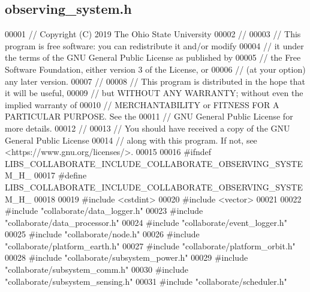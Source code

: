 \hypertarget{observing__system_8h_source}{}\subsection{observing\+\_\+system.\+h}
\label{observing__system_8h_source}

\begin{DoxyCode}
00001 \textcolor{comment}{// Copyright (C) 2019 The Ohio State University}
00002 \textcolor{comment}{//}
00003 \textcolor{comment}{// This program is free software: you can redistribute it and/or modify}
00004 \textcolor{comment}{// it under the terms of the GNU General Public License as published by}
00005 \textcolor{comment}{// the Free Software Foundation, either version 3 of the License, or}
00006 \textcolor{comment}{// (at your option) any later version.}
00007 \textcolor{comment}{//}
00008 \textcolor{comment}{// This program is distributed in the hope that it will be useful,}
00009 \textcolor{comment}{// but WITHOUT ANY WARRANTY; without even the implied warranty of}
00010 \textcolor{comment}{// MERCHANTABILITY or FITNESS FOR A PARTICULAR PURPOSE.  See the}
00011 \textcolor{comment}{// GNU General Public License for more details.}
00012 \textcolor{comment}{//}
00013 \textcolor{comment}{// You should have received a copy of the GNU General Public License}
00014 \textcolor{comment}{// along with this program.  If not, see <https://www.gnu.org/licenses/>.}
00015 
00016 \textcolor{preprocessor}{#ifndef LIBS\_COLLABORATE\_INCLUDE\_COLLABORATE\_OBSERVING\_SYSTEM\_H\_}
00017 \textcolor{preprocessor}{#define LIBS\_COLLABORATE\_INCLUDE\_COLLABORATE\_OBSERVING\_SYSTEM\_H\_}
00018 
00019 \textcolor{preprocessor}{#include <cstdint>}
00020 \textcolor{preprocessor}{#include <vector>}
00021 
00022 \textcolor{preprocessor}{#include "collaborate/data\_logger.h"}
00023 \textcolor{preprocessor}{#include "collaborate/data\_processor.h"}
00024 \textcolor{preprocessor}{#include "collaborate/event\_logger.h"}
00025 \textcolor{preprocessor}{#include "collaborate/node.h"}
00026 \textcolor{preprocessor}{#include "collaborate/platform\_earth.h"}
00027 \textcolor{preprocessor}{#include "collaborate/platform\_orbit.h"}
00028 \textcolor{preprocessor}{#include "collaborate/subsystem\_power.h"}
00029 \textcolor{preprocessor}{#include "collaborate/subsystem\_comm.h"}
00030 \textcolor{preprocessor}{#include "collaborate/subsystem\_sensing.h"}
00031 \textcolor{preprocessor}{#include "collaborate/scheduler.h"}

\end{DoxyCode}
